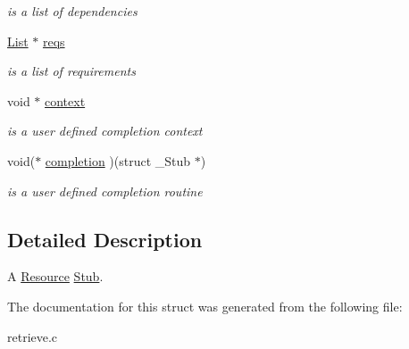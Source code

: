 \begin{DoxyCompactItemize}
\begin{DoxyCompactList}\small\item\em is a list of dependencies \end{DoxyCompactList}\item 
\mbox{\label{structStub_a08ba060435c86dcf589680e6d59b9a56}} 
\hyperlink{structList}{List} $\ast$ \hyperlink{structStub_a08ba060435c86dcf589680e6d59b9a56}{reqs}
\begin{DoxyCompactList}\small\item\em is a list of requirements \end{DoxyCompactList}\item 
\mbox{\label{structStub_a07a309b9a6b90d1ead7cd3eb6ec04105}} 
void $\ast$ \hyperlink{structStub_a07a309b9a6b90d1ead7cd3eb6ec04105}{context}
\begin{DoxyCompactList}\small\item\em is a user defined completion context \end{DoxyCompactList}\item 
\mbox{\label{structStub_aeda3e44f0c4625dfcbfceaf60d09f769}} 
void($\ast$ \hyperlink{structStub_aeda3e44f0c4625dfcbfceaf60d09f769}{completion} )(struct \+\_\+\+Stub $\ast$)
\begin{DoxyCompactList}\small\item\em is a user defined completion routine \end{DoxyCompactList}\end{DoxyCompactItemize}


\subsection{Detailed Description}
A \hyperlink{structResource}{Resource} \hyperlink{structStub}{Stub}. 

The documentation for this struct was generated from the following file\+:\begin{DoxyCompactItemize}
\item 
retrieve.\+c\end{DoxyCompactItemize}
